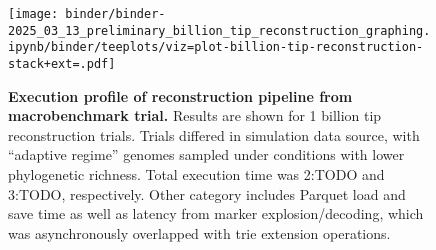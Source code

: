 \begin{figure}[h]
\centering
\texttt{[image: binder/binder-2025\_03\_13\_preliminary\_billion\_tip\_reconstruction\_graphing.ipynb/binder/teeplots/viz=plot-billion-tip-reconstruction-stack+ext=.pdf]}

\caption{%
\textbf{Execution profile of reconstruction pipeline from macrobenchmark trial.}
\small
Results are shown for 1 billion tip reconstruction trials.
Trials differed in simulation data source, with ``adaptive regime'' genomes sampled under conditions with lower phylogenetic richness.
Total execution time was 2:TODO and 3:TODO, respectively.
Other category includes Parquet load and save time as well as latency from marker explosion/decoding, which was asynchronously overlapped with trie extension operations.
}
\label{fig:billion-tip-time}
\end{figure}